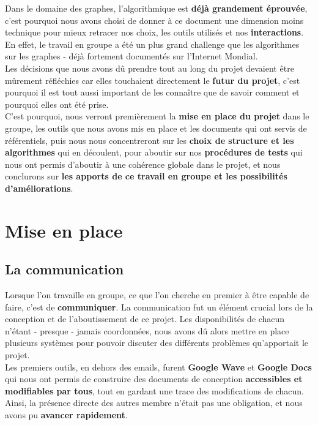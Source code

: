 \documentclass[a4paper, titlepage, oneside]{book}
\begin{document}
Dans le domaine des graphes, l'algorithmique est \textbf{déjà grandement éprouvée}, c'est pourquoi nous avons choisi de donner à ce document une dimension moins technique pour mieux retracer nos choix, les outils utilisés et nos \textbf{interactions}.\\
En effet, le travail en groupe a été un plus grand challenge que les algorithmes sur les graphes - déjà fortement documentés sur l'Internet Mondial.\\
Les décisions que nous avons dû prendre tout au long du projet devaient être mûrement réfléchies car elles touchaient directement le \textbf{futur du projet}, c'est pourquoi il est tout aussi important de les connaître que de savoir comment et pourquoi elles ont été prise.\\

C'est pourquoi, nous verront premièrement la \textbf{mise en place du projet} dans le groupe, les outils que nous avons mis en place et les documents qui ont servis de référentiels, puis nous nous concentreront sur les \textbf{choix de structure et les algorithmes} qui en découlent, pour aboutir sur nos \textbf{procédures de tests} qui nous ont permis d'aboutir à une cohérence globale dans le projet, et nous conclurons sur \textbf{les apports de ce travail en groupe et les possibilités d'améliorations}.

\chapter{Mise en place}

\section{La communication}
Lorsque l'on travaille en groupe, ce que l'on cherche en premier à être capable de faire, c'est de \textbf{communiquer}. La communication fut un élément crucial lors de la conception et de l'aboutissement de ce projet. Les disponibilités de chacun n'étant - presque - jamais coordonnées, nous avons dû alors mettre en place plusieurs systèmes pour pouvoir discuter des différents problèmes qu'apportait le projet.\\

Les premiers outils, en dehors des emails, furent \textbf{Google Wave} et \textbf{Google Docs} qui nous ont permis de construire des documents de conception \textbf{accessibles et modifiables par tous}, tout en gardant une trace des modifications de chacun. Ainsi, la présence directe des autres membre n'était pas une obligation, et nous avons pu \textbf{avancer rapidement}.
\end{document}
